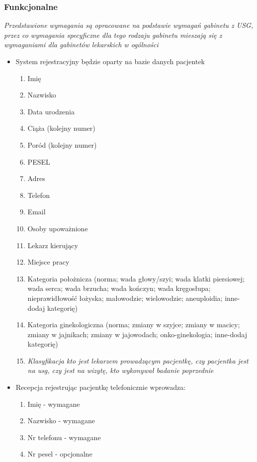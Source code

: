 \documentclass[10pt,a4paper]{article}
\begin{document}
\subsubsection{Funkcjonalne}
\small\emph{Przedstawione wymagania są opracowane na podstawie wymagań gabinetu z USG, przez co wymagania specyficzne dla tego rodzaju gabinetu mieszają się z  wymaganiami dla gabinetów lekarskich w ogólności}
\begin{itemize}
    \item System rejestracyjny będzie oparty na bazie danych pacjentek \begin{enumerate}
      \item Imię
      \item Nazwisko
      \item Data urodzenia
      \item Ciąża (kolejny numer)
      \item Poród (kolejny numer)
      \item PESEL
      \item Adres
      \item Telefon
      \item Email
      \item Osoby upoważnione
      \item Lekarz kierujący
      \item Miejsce pracy
      \item Kategoria położnicza (norma; wada głowy/szyi; wada klatki piersiowej; wada serca; wada brzucha; wada kończyn; wada kręgosłupa; nieprawidłowość łożyska; małowodzie; wielowodzie; aneuploidia; inne-dodaj kategorię)
      \item Kategoria ginekologiczna (norma; zmiany w szyjce; zmiany w macicy; zmiany w jajnikach; zmiany w jajowodach; onko-ginekologia; inne-dodaj kategorię)
      \item \emph{Klasyfikacja kto jest lekarzem prowadzącym pacjentkę, czy pacjentka jest na usg, czy jest na wizytę, kto wykonywał badanie poprzednie}
    \end{enumerate}
    \item Recepcja rejestrując pacjentkę telefonicznie wprowadza: \begin{enumerate}
      \item Imię - wymagane
      \item Nazwisko - wymagane
      \item Nr telefonu - wymagane
      \item Nr pesel - opcjonalne

\end{enumerate}
\end{itemize}
\end{document}
